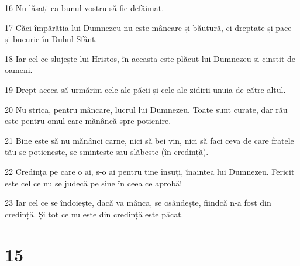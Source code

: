 \par 16 Nu lăsați ca bunul vostru să fie defăimat.
\par 17 Căci împărăția lui Dumnezeu nu este mâncare și băutură, ci dreptate și pace și bucurie în Duhul Sfânt.
\par 18 Iar cel ce slujește lui Hristos, în aceasta este plăcut lui Dumnezeu și cinstit de oameni.
\par 19 Drept aceea să urmărim cele ale păcii și cele ale zidirii unuia de către altul.
\par 20 Nu strica, pentru mâncare, lucrul lui Dumnezeu. Toate sunt curate, dar rău este pentru omul care mănâncă spre poticnire.
\par 21 Bine este să nu mănânci carne, nici să bei vin, nici să faci ceva de care fratele tău se poticnește, se smintește sau slăbește (în credință).
\par 22 Credința pe care o ai, s-o ai pentru tine însuți, înaintea lui Dumnezeu. Fericit este cel ce nu se judecă pe sine în ceea ce aprobă!
\par 23 Iar cel ce se îndoiește, dacă va mânca, se osândește, fiindcă n-a fost din credință. Și tot ce nu este din credință este păcat.

\chapter{15}


